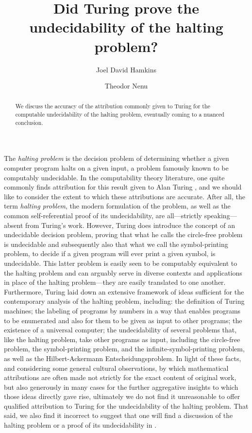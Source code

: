 \documentclass{amsart}
\title{Did Turing prove the undecidability of the halting problem?}
\author[Hamkins]{Joel David Hamkins}
\author[Nenu]{Theodor Nenu}
\begin{document}
\begin{abstract}

We discuss the accuracy of the attribution commonly given to Turing \cite{Turing1936:On-computable-numbers} for the computable undecidability of the halting problem, eventually coming to a nuanced conclusion.

\end{abstract}
\maketitle

\begin{quote}
\setcounter{tocdepth}{1}
\footnotesize
\tableofcontents
\end{quote}

The \emph{halting problem} is the decision problem of determining whether a given computer program halts on a given input, a problem famously known to be computably undecidable. In the computability theory literature, one quite commonly finds attribution for this result given to Alan Turing \cite{Turing1936:On-computable-numbers}, and we should like to consider the extent to which these attributions are accurate. After all, the term \emph{halting problem}, the modern formulation of the problem, as well as the common self-referential proof of its undecidability, are all---strictly speaking---absent from Turing's work. However, Turing does introduce the concept of an undecidable decision problem, proving that what he calls the circle-free problem is undecidable and subsequently also that what we call the symbol-printing problem, to decide if a given program will ever print a given symbol, is undecidable. This latter problem is easily seen to be computably equivalent to the halting problem and can arguably serve in diverse contexts and applications in place of the halting problem---they are easily translated to one another. Furthermore, Turing laid down an extensive framework of ideas sufficient for the contemporary analysis of the halting problem, including: the definition of Turing machines; the labeling of programs by numbers in a way that enables programs to be enumerated and also for them to be given as input to other programs; the existence of a universal computer; the undecidability of several problems that, like the halting problem, take other programs as input, including the circle-free problem, the symbol-printing problem, and the infinite-symbol-printing problem, as well as the Hilbert-Ackermann Entscheidungsproblem. In light of these facts, and considering some general cultural observations, by which mathematical attributions are often made not strictly for the exact content of original work, but also generously in many cases for the further aggregative insights to which those ideas directly gave rise, ultimately we do not find it unreasonable to offer qualified attribution to Turing for the undecidability of the halting problem. That said, we also find it incorrect to suggest that one will find a discussion of the halting problem or a proof of its undecidability in \cite{Turing1936:On-computable-numbers}.\goodbreak
\end{document}
